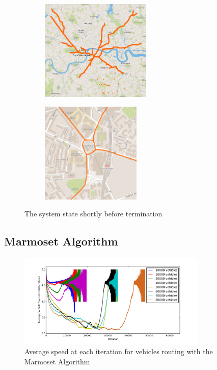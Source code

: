 \documentclass[ %
                    author={Alexander Hill},
                supervisor={Dr. Benjamin Sach},
                    degree={MEng},
                     title={MARMOSET},
                  subtitle={Multi-Agent Route Management using Online Simulation for Efficient Transportation},
                      type={research},
                      year={2016} ]{dissertation}
\begin{document}
\begin{figure}[h]
\centering
\begin{subfigure}[b]{0.4\textwidth}
    \centering
    \includegraphics[height=13em]{dij-60k-blocked-wide}
\end{subfigure}
\hspace{1em}
\begin{subfigure}[b]{0.4\textwidth}
    \centering
    \includegraphics[height=13em]{dij-60k-blocked-close}
\end{subfigure}
\caption{The system state shortly before termination}\label{fig:dijkstra-wtf}
\end{figure}

\subsection{Marmoset Algorithm}

\begin{figure}[p]
    \centering
    \includegraphics[width=0.8\textwidth]{sdv-speed}
    \caption{Average speed at each iteration for vehicles routing with the Marmoset Algorithm}\label{fig:sdv-speed}
\end{figure}
\end{document}
